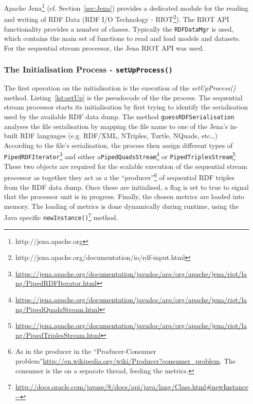Apache Jena\footnote{http://jena.apache.org} (cf. Section~\ref{sec:Jena}) provides a dedicated module for the reading and writing of RDF Data (RDF I/O Technology - RIOT\footnote{http://jena.apache.org/documentation/io/rdf-input.html}).
The RIOT API functionality provides a number of classes.
Typically the \texttt{RDFDataMgr} is used, which contains the main set of functions to read and load models and datasets.
For the sequential stream processor, the Jena RIOT API was used.

\subsubsection{The Initialisation Process - \texttt{setUpProcess()}}
The first operation on the initialisation is the execution of the \emph{setUpProcess()} method.
Listing~\ref{lst:setUp} is the pseudocode of the the process.
The sequential stream processor starts its initialisation by first trying to identify the serialisation used by the available RDF data dump.
The method \texttt{guessRDFSerialisation} analyses the file serialisation by mapping the file name to one of the Jena's in-built RDF languages (e.g. RDF/XML, NTriples, Turtle, NQuads, etc\dots)
According to the file's serialisation, the process then assign different types of \texttt{PipedRDFIterator}\footnote{\url{https://jena.apache.org/documentation/javadoc/arq/org/apache/jena/riot/lang/PipedRDFIterator.html}} and either a\texttt{PipedQuadsStream}\footnote{\url{https://jena.apache.org/documentation/javadoc/arq/org/apache/jena/riot/lang/PipedQuadsStream.html}} or \texttt{PipedTriplesStream}\footnote{\url{https://jena.apache.org/documentation/javadoc/arq/org/apache/jena/riot/lang/PipedTriplesStream.html}} 
These two objects are required for the scalable execution of the sequential stream processor as together they act as a the ``producer''\footnote{As in the producer in the ``Producer-Consumer problem''\url{http://en.wikipedia.org/wiki/Producer?consumer_problem}. The consumer is the on a separate thread, feeding the metrics.} of sequential RDF triples from the RDF data dump.
Once these are initialised, a flag is set to true to signal that the processor unit is in progress.
Finally, the chosen metrics are loaded into memory.
The loading of metrics is done dynamically during runtime, using the Java specific \texttt{newInstance()}\footnote{\url{http://docs.oracle.com/javase/8/docs/api/java/lang/Class.html#newInstance--}} method. 

